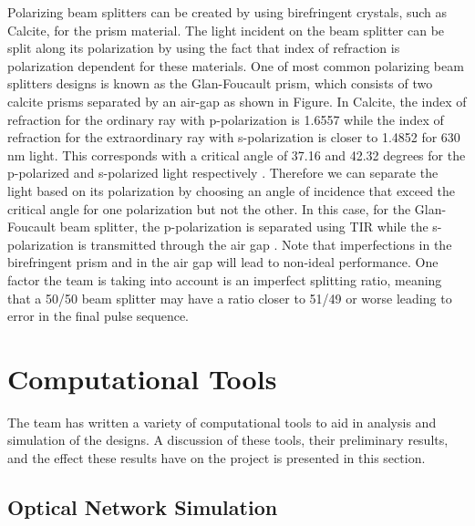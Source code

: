 \documentclass[pdftex,12pt,a4paper]{article}
\begin{document}
Polarizing beam splitters can be created by using birefringent crystals, such as Calcite, for the prism material. The light incident on the beam splitter can be split along its polarization by using the fact that index of refraction is polarization dependent for these materials. One of most common polarizing beam splitters designs is known as the Glan-Foucault prism, which consists of two calcite prisms separated by an air-gap as shown in Figure. In Calcite, the index of refraction for the ordinary ray with p-polarization is 1.6557 while the index of refraction for the extraordinary ray with s-polarization is closer to 1.4852 for 630 nm light. This corresponds with a critical angle of 37.16 and 42.32 degrees for the p-polarized and s-polarized light respectively \cite{Properties_of_Prisms}. Therefore we can separate the light based on its polarization by choosing an angle of incidence that exceed the critical angle for one polarization but not the other. In this case, for the Glan-Foucault beam splitter, the p-polarization is separated using TIR while the s-polarization is transmitted through the air gap \cite{Properties_of_Prisms}. Note that imperfections in the birefringent prism and in the air gap will lead to non-ideal performance. One factor the team is taking into account is an imperfect splitting ratio, meaning that a 50/50 beam splitter may have a ratio closer to 51/49 or worse leading to error in the final pulse sequence.

\section{Computational Tools}
\label{sec:results}
The team has written a variety of computational tools to aid in analysis and simulation of the designs. A discussion of these tools, their preliminary results, and the effect these results have on the project is presented in this section.

\subsection{Optical Network Simulation}
\label{simulation}
\end{document}
